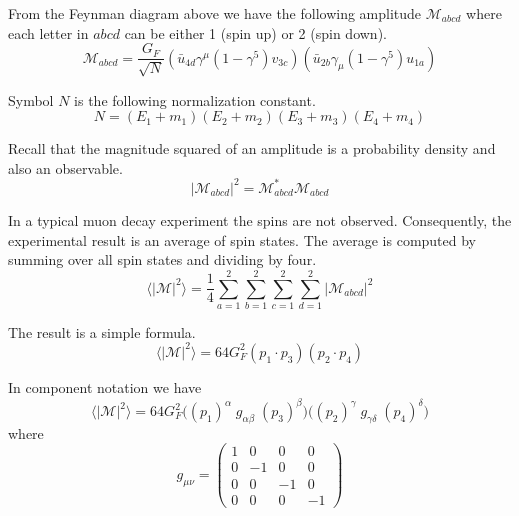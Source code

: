 \documentclass[12pt]{article}
\begin{document}
\noindent
From the Feynman diagram above we have the following amplitude $\mathcal{M}_{abcd}$
where each letter in $abcd$ can be either 1 (spin up) or 2 (spin down).
\begin{equation*}
\mathcal{M}_{abcd}=\frac{G_F}{\sqrt{N}}
\left(\bar{u}_{4d}\gamma^\mu(1-\gamma^5)v_{3c}\right)
\left(\bar{u}_{2b}\gamma_\mu(1-\gamma^5)u_{1a}\right)
\end{equation*}

\noindent
Symbol $N$ is the following normalization constant.
\begin{equation*}
N=(E_1+m_1)(E_2+m_2)(E_3+m_3)(E_4+m_4)
\end{equation*}

\noindent
Recall that the magnitude squared of an amplitude is a probability density and also an observable.
\begin{equation*}
|\mathcal{M}_{abcd}|^2=\mathcal{M}_{abcd}^*\mathcal{M}_{abcd}
\end{equation*}

\noindent
In a typical muon decay experiment the spins are not observed.
Consequently, the experimental result is an average of spin states.
The average is computed by summing over all spin states and dividing by four.
\begin{equation*}
\langle|\mathcal{M}|^2\rangle=
\frac{1}{4}
\sum_{a=1}^2\sum_{b=1}^2\sum_{c=1}^2\sum_{d=1}^2
|\mathcal{M}_{abcd}|^2
\end{equation*}

\noindent
The result is a simple formula.
\begin{equation*}
\langle|\mathcal{M}|^2\rangle=64G_F^2(p_1\cdot p_3)(p_2\cdot p_4)
\tag{1}
\end{equation*}

\noindent
In component notation we have
\begin{equation*}
\langle|\mathcal{M}|^2\rangle=64G_F^2
\bigg((p_1)^\alpha \; g_{\alpha\beta}\; (p_3)^\beta\bigg)
\bigg((p_2)^\gamma \; g_{\gamma\delta} \; (p_4)^\delta\bigg)
\end{equation*}
where
\begin{equation*}
g_{\mu\nu}=\begin{pmatrix}
1 & 0 & 0 & 0\\
0 & -1 & 0 & 0\\
0 & 0 & -1 & 0\\
0 & 0 & 0 & -1
\end{pmatrix}
\end{equation*}
\end{document}

